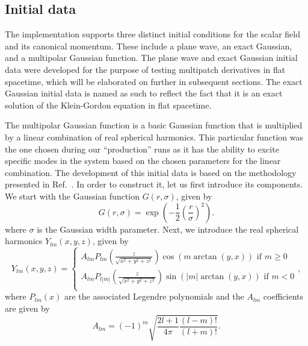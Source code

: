 \subsection{Initial data}

The implementation supports three distinct initial conditions for the scalar field and its canonical momentum. These include a plane wave, an exact Gaussian, and a multipolar Gaussian function. The plane wave and exact Gaussian initial data were developed for the purpose of testing multipatch derivatives in flat spacetime, which will be elaborated on further in subsequent sections. The exact Gaussian initial data is named as such to reflect the fact that it is an exact solution of the Klein-Gordon equation in flat spacetime.

The multipolar Gaussian function is a basic Gaussian function that is multiplied by a linear combination of real spherical harmonics. This particular function was the one chosen during our ``production'' runs as it has the ability to excite specific modes in the system based on the chosen parameters for the linear combination. The development of this initial data is based on the methodology presented in Ref.~\cite{PhysRevD.87.043513}. In order to construct it, let us first introduce its components. We start with the Gaussian function $G(r, \sigma)$, given by
%
\begin{equation}
  G(r, \sigma) = \exp\left( -\frac{1}{2} \left( \frac{r}{\sigma} \right)^2  \right).
  \label{eq:wave_scattering_gaussian}
\end{equation}
%
where $\sigma$ is the Gaussian width parameter. Next, we introduce the real spherical harmonics $Y_{lm}(x,y,z)$, given by
%
\begin{equation}
  Y_{lm}(x, y, z) =
  \begin{cases}
    A_{lm} P_{lm}\left( \frac{z}{\sqrt{x^2 + y^2 + z^2}} \right) \cos(m \arctan(y,x)) \text{ if } m \geq 0  \\
    A_{lm} P_{l|m|}\left( \frac{z}{\sqrt{x^2 + y^2 + z^2}} \right) \sin(|m| \arctan(y,x)) \text{ if } m < 0 \\
  \end{cases}
  ,
  \label{eq:wave_scattering_real_spherical_harmonics}
\end{equation}
%
where $P_{lm}(x)$ are the associated Legendre polynomials and the $A_{lm}$ coefficients are given by
%
\begin{equation}
  A_{lm} = (-1)^m \sqrt{\frac{2 l + 1}{4\pi} \frac{(l-m)!}{(l+m)!}}.
  \label{eq:wave_scattering_real_spherical_harmonics_coeffs}
\end{equation}
